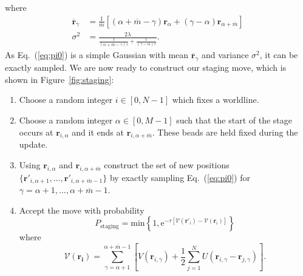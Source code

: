 \documentclass[prb,aps,amssym,nofootinbib,floatfix,notitlepage]{revtex4-1}
\renewcommand{\vec}[1]{\boldsymbol{#1}}
\newcommand{\e}[1]{\mathrm{e}^{#1}}
\renewcommand{\eqref}[1]{Eq.~(\ref{#1})}
\begin{document}
%
where 
%
\begin{align}
    \overline{\vec{r}}_\gamma &= \frac{1}{\overline{m}}
    \left[(\alpha+\overline{m}-\gamma)\vec{r}_{\alpha} +
    (\gamma-\alpha)\vec{r}_{\alpha+\overline{m}}\right] \nonumber \\
    \sigma^2 &= \frac{2\lambda}{\frac{1}{(\alpha + \overline{m} - \gamma)\tau} +
\frac{1}{(\gamma-\alpha)\tau}}.
\end{align}
%
As \eqref{eq:pi0} is a simple Gaussian with mean $\overline{\vec{r}}_\gamma$ and
variance $\sigma^2$, it can be exactly sampled.  We are now ready to construct
our staging move, which is shown in Figure~\ref{fig:staging}:
\begin{enumerate}
    \item Choose a random integer $i \in [0,N-1]$ which fixes a worldline.
    \item Choose a random integer $\alpha \in [0,M-1]$ such that the start of
        the stage occurs at $\vec{r}_{i,\alpha}$ and it ends at
        $\vec{r}_{i,\alpha+\overline{m}}$.  These beads are held fixed during
    the update.  \item Using $\vec{r}_{i,\alpha}$ and
        $\vec{r}_{i,\alpha+\overline{m}}$ construct the set of new positions
        $\{\vec{r}'_{i,\alpha+1},\ldots,\vec{r}'_{i,\alpha+\overline{m}-1}\}$ by exactly
        sampling \eqref{eq:pi0} for $\gamma =
        \alpha+1,\ldots,\alpha+\overline{m}-1$.
    \item Accept the move with probability
\begin{equation}
    P_{\text{staging}} = \mathrm{min} 
    \left\{1,\e{-\tau[\mathcal{V}(\vec{r}'_i)-\mathcal{V}(\vec{r}_i)]} \right\}
\end{equation}
%
where 
%
\begin{equation}
    \mathcal{V}(\vec{r_i}) = \sum_{\gamma=\alpha+1}^{\alpha+\overline{m}-1}
    \left[ V(\vec{r}_{i,\gamma}) + \frac{1}{2}\sum_{j=1}^{N}
    U(\vec{r}_{i,\gamma}-\vec{r}_{j,\gamma})\right].
\end{equation}
%
\end{enumerate}
\end{document}
